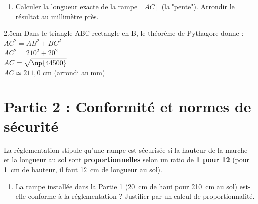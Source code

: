 \documentclass[a4paper]{book}
\begin{document}
{\begin{exercice}
\begin{center}
        \end{center}

        \begin{enumerate}[leftmargin=*]
            \item Calculer la longueur exacte de la rampe $[AC]$ (la "pente"). Arrondir le résultat au millimètre près.
        \end{enumerate}  

        \begin{ZoneReponse}{2.5cm}
            Dans le triangle ABC rectangle en B, le théorème de Pythagore donne : \\
            $AC^2=AB^2+BC^2$\\
            $AC^2=210^2+20^2$\\
            $AC=\sqrt{\np{44500}}$\\
            $AC\simeq211,0$ cm (arrondi au mm)
        \end{ZoneReponse}
        
        \section*{Partie 2 : Conformité et normes de sécurité}
        La réglementation stipule qu'une rampe est sécurisée si la hauteur de la marche et la longueur au sol sont \textbf{proportionnelles} selon un ratio de \textbf{1 pour 12} (pour 1~cm de hauteur, il faut 12~cm de longueur au sol).
        
        \begin{enumerate}[resume,leftmargin=*]
            \item La rampe installée dans la Partie 1 (20~cm de haut pour 210~cm au sol) est-elle conforme à la réglementation ? Justifier par un calcul de proportionnalité.


\end{enumerate}
\end{exercice}}
\end{document}
